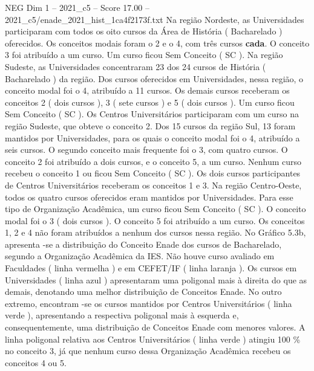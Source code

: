 \begin{textsample}{NEG Dim 1 – 2021\_c5 – Score 17.00 – 2021\_c5/enade\_2021\_hist\_1ca4f2173f.txt}
Na região Nordeste, as Universidades participaram com todos os oito cursos da Área de História ( Bacharelado ) oferecidos.
Os conceitos modais foram o 2 e o 4, com três cursos \textbf{cada}.
O conceito 3 foi atribuído a um curso.
Um curso ficou Sem Conceito ( SC ).
Na região Sudeste, as Universidades concentraram 23 dos 24 cursos de História ( Bacharelado ) da região.
Dos cursos oferecidos em Universidades, nessa região, o conceito modal foi o 4, atribuído a 11 cursos.
Os demais cursos receberam os conceitos 2 ( dois cursos ), 3 ( sete cursos ) e 5 ( dois cursos ).
Um curso ficou Sem Conceito ( SC ).
Os Centros Universitários participaram com um curso na região Sudeste, que obteve o conceito 2.
Dos 15 cursos da região Sul, 13 foram mantidos por Universidades, para os quais o conceito modal foi o 4, atribuído a seis cursos.
O segundo conceito mais frequente foi o 3, com quatro cursos.
O conceito 2 foi atribuído a dois cursos, e o conceito 5, a um curso.
Nenhum curso recebeu o conceito 1 ou ficou Sem Conceito ( SC ).
Os dois cursos participantes de Centros Universitários receberam os conceitos 1 e 3.
Na região Centro-Oeste, todos os quatro cursos oferecidos eram mantidos por Universidades.
Para esse tipo de Organização Acadêmica, um curso ficou Sem Conceito ( SC ).
O conceito modal foi o 3 ( dois cursos ).
O conceito 5 foi atribuído a um curso.
Os conceitos 1, 2 e 4 não foram atribuídos a nenhum dos cursos nessa região.
No Gráfico 5.3b, apresenta -se a distribuição do Conceito Enade dos cursos de Bacharelado, segundo a Organização Acadêmica da IES.
Não houve curso avaliado em Faculdades ( linha vermelha ) e em CEFET/IF ( linha laranja ).
Os cursos em Universidades ( linha azul ) apresentaram uma poligonal mais à direita do que as demais, denotando uma melhor distribuição de Conceitos Enade.
No outro extremo, encontram -se os cursos mantidos por Centros Universitários ( linha verde ), apresentando a respectiva poligonal mais à esquerda e, consequentemente, uma distribuição de Conceitos Enade com menores valores.
A linha poligonal relativa aos Centros Universitários ( linha verde ) atingiu 100 \% no conceito 3, já que nenhum curso dessa Organização Acadêmica recebeu os conceitos 4 ou 5.

\end{textsample}
